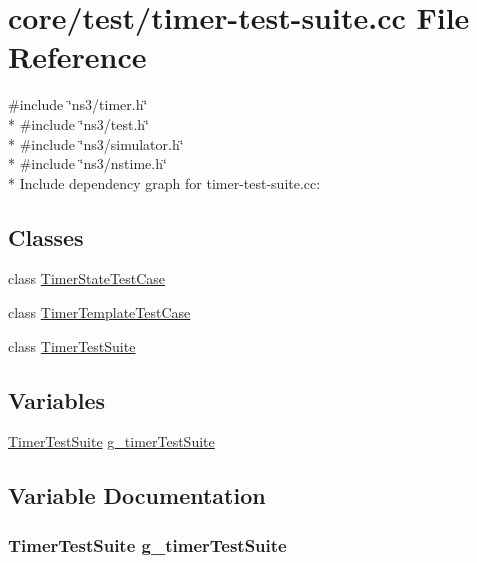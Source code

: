 \hypertarget{timer-test-suite_8cc}{}\section{core/test/timer-\/test-\/suite.cc File Reference}
\label{timer-test-suite_8cc}
{\ttfamily \#include \char`\"{}ns3/timer.\+h\char`\"{}}\\*
{\ttfamily \#include \char`\"{}ns3/test.\+h\char`\"{}}\\*
{\ttfamily \#include \char`\"{}ns3/simulator.\+h\char`\"{}}\\*
{\ttfamily \#include \char`\"{}ns3/nstime.\+h\char`\"{}}\\*
Include dependency graph for timer-\/test-\/suite.cc\+:
\subsection*{Classes}
\begin{DoxyCompactItemize}
\item 
class \hyperlink{classTimerStateTestCase}{Timer\+State\+Test\+Case}
\item 
class \hyperlink{classTimerTemplateTestCase}{Timer\+Template\+Test\+Case}
\item 
class \hyperlink{classTimerTestSuite}{Timer\+Test\+Suite}
\end{DoxyCompactItemize}
\subsection*{Variables}
\begin{DoxyCompactItemize}
\item 
\hyperlink{classTimerTestSuite}{Timer\+Test\+Suite} \hyperlink{timer-test-suite_8cc_ae85bc5bfe1d9f21cfef5ff23a6ddb7b4}{g\+\_\+timer\+Test\+Suite}
\end{DoxyCompactItemize}


\subsection{Variable Documentation}
\subsubsection[{\texorpdfstring{g\+\_\+timer\+Test\+Suite}{g_timerTestSuite}}]{\setlength{\rightskip}{0pt plus 5cm} {\bf Timer\+Test\+Suite}  g\+\_\+timer\+Test\+Suite\hspace{0.3cm}{\ttfamily [static]}}\hypertarget{timer-test-suite_8cc_ae85bc5bfe1d9f21cfef5ff23a6ddb7b4}{}\label{timer-test-suite_8cc_ae85bc5bfe1d9f21cfef5ff23a6ddb7b4}

